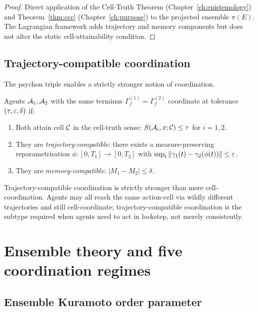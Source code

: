 \begin{proof}
Direct application of the Cell-Truth Theorem (Chapter~\ref{ch:epistemology})
and Theorem~\ref{thm:ccc} (Chapter~\ref{ch:purpose}) to the projected
ensemble $\pi(E)$. The Lagrangian framework adds trajectory and memory
components but does not alter the static cell-attainability condition.
\end{proof}

\subsection{Trajectory-compatible coordination}

The psychon triple enables a strictly stronger notion of coordination.

\begin{definition}\label{def:tcc}
Agents $\mathcal{A}_1,\mathcal{A}_2$ with the same terminus
$\Gamma_f^{(1)}=\Gamma_f^{(2)}$ coordinate at tolerance
$(\tau,\varepsilon,\delta)$ if:
\begin{enumerate}[label=(\arabic*),leftmargin=*]
\item Both attain cell $\mathcal{C}$ in the cell-truth sense:
  $S(\mathcal{A}_i,x;\mathcal{C})\le\tau$ for $i=1,2$.
\item They are \emph{trajectory-compatible}: there exists a
  measure-preserving reparametrisation $\phi:[0,T_1]\to[0,T_2]$ with
  $\sup_t\|\gamma_1(t)-\gamma_2(\phi(t))\|\le\varepsilon$.
\item They are \emph{memory-compatible}: $|M_1-M_2|\le\delta$.
\end{enumerate}
\end{definition}

Trajectory-compatible coordination is strictly stronger than mere
cell-coordination. Agents may all reach the same action-cell via wildly
different trajectories and still cell-coordinate; trajectory-compatible
coordination is the subtype required when agents need to act in lockstep,
not merely consistently.

\section{Ensemble theory and five coordination regimes}
\label{sec:ch04-ensemble}

\subsection{Ensemble Kuramoto order parameter}

